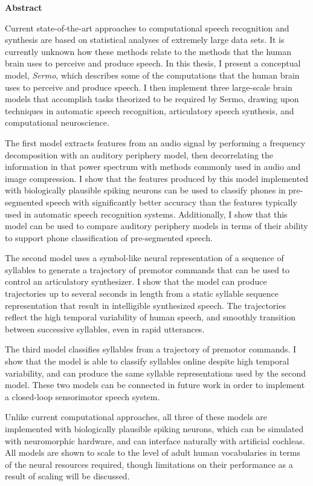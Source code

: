 \begin{center}\textbf{Abstract}\end{center}

Current state-of-the-art approaches
to computational
speech recognition and synthesis
are based on statistical analyses
of extremely large data sets.
It is currently unknown how these methods
relate to the methods that the human brain
uses to perceive and produce speech.
In this thesis,
I present a conceptual model, \textit{Sermo},
which describes some of the computations that
the human brain uses to
perceive and produce speech.
I then implement three large-scale brain models
that accomplish tasks
theorized to be required by Sermo,
drawing upon techniques
in automatic speech recognition,
articulatory speech synthesis,
and computational neuroscience.

The first model extracts features
from an audio signal by
performing a frequency decomposition
with an auditory periphery model,
then decorrelating the information
in that power spectrum
with methods commonly used in
audio and image compression.
I show that the features produced
by this model implemented
with biologically plausible spiking neurons
can be used to classify phones in
pre-segmented speech with significantly
better accuracy than the features
typically used in
automatic speech recognition systems.
Additionally, I show that this model
can be used to compare auditory periphery models
in terms of their ability to
support phone classification of pre-segmented speech.

The second model
uses a symbol-like neural representation
of a sequence of syllables
to generate a trajectory of premotor commands
that can be used to control
an articulatory synthesizer.
I show that the model
can produce trajectories
up to several seconds in length
from a static syllable sequence representation
that result in
intelligible synthesized speech.
The trajectories reflect the
high temporal variability
of human speech,
and smoothly transition between
successive syllables,
even in rapid utterances.

The third model
classifies syllables
from a trajectory of premotor commands.
I show that the model is able to
classify syllables online
despite high temporal variability,
and can produce the same
syllable representations
used by the second model.
These two models can be connected
in future work in order to implement
a closed-loop sensorimotor speech system.

Unlike current computational approaches,
all three of these models are implemented
with biologically plausible spiking neurons,
which can be simulated with neuromorphic hardware,
and can interface naturally with artificial cochleas.
All models are shown to scale
to the level of adult human vocabularies
in terms of the neural resources required,
though limitations on their performance
as a result of scaling will be discussed.

\cleardoublepage
